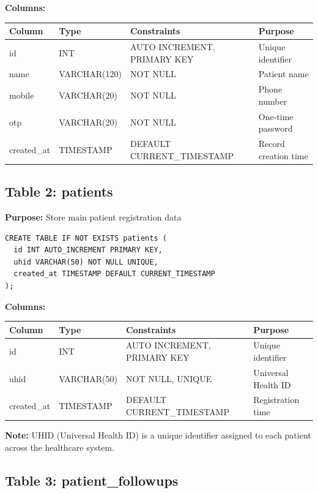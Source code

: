 \documentclass[12pt,a4paper]{article}
\begin{document}
\textbf{Columns:}
\begin{table}[h]
\centering
\begin{tabular}{|l|l|l|l|}
\hline
\textbf{Column} & \textbf{Type} & \textbf{Constraints} & \textbf{Purpose} \\
\hline
id & INT & AUTO INCREMENT, PRIMARY KEY & Unique identifier \\
name & VARCHAR(120) & NOT NULL & Patient name \\
mobile & VARCHAR(20) & NOT NULL & Phone number \\
otp & VARCHAR(20) & NOT NULL & One-time password \\
created\_at & TIMESTAMP & DEFAULT CURRENT\_TIMESTAMP & Record creation time \\
\hline
\end{tabular}
\end{table}

\subsection{Table 2: patients}

\textbf{Purpose:} Store main patient registration data

\begin{lstlisting}[caption={patients Table Schema}]
CREATE TABLE IF NOT EXISTS patients (
  id INT AUTO_INCREMENT PRIMARY KEY,
  uhid VARCHAR(50) NOT NULL UNIQUE,
  created_at TIMESTAMP DEFAULT CURRENT_TIMESTAMP
);
\end{lstlisting}

\textbf{Columns:}
\begin{table}[h]
\centering
\begin{tabular}{|l|l|l|l|}
\hline
\textbf{Column} & \textbf{Type} & \textbf{Constraints} & \textbf{Purpose} \\
\hline
id & INT & AUTO INCREMENT, PRIMARY KEY & Unique identifier \\
uhid & VARCHAR(50) & NOT NULL, UNIQUE & Universal Health ID \\
created\_at & TIMESTAMP & DEFAULT CURRENT\_TIMESTAMP & Registration time \\
\hline
\end{tabular}
\end{table}

\textbf{Note:} UHID (Universal Health ID) is a unique identifier assigned to each patient across the healthcare system.

\subsection{Table 3: patient\_followups}
\end{document}
